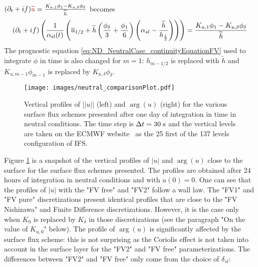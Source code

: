 $ (\partial_t+if) \emphase{\widetilde{u}}
= \frac{K_{u, 1}\phi_1 - K_{u,\delta} \phi_{\delta}}{\widetilde{h}}$
becomes
\begin{equation}
	\label{eq:ND_NeutralCase_semiDiscreteEkmanEqFVfree}
	(\partial_t+if) \left(\frac{1}{\alpha_{\rm sl}(t)}
	\left(\overline{u}_{1/2} + \widetilde{h}
	\left(\frac{\phi_{\delta}}{3} + \frac{\phi_1}{6}\right)
	\left(\alpha_{sl} - \frac{\widetilde{h}}{h_{\frac{1}{2}}}\right)
	\right)\right)
	= \frac{K_{u, 1}\phi_1 - K_{u,\delta} \phi_{\delta}}{\widetilde{h}}
\end{equation}
The prognostic equation \eqref{eq:ND_NeutralCase_continuityEquationFV}
used to integrate $\phi$ in time
is also changed for $m=1$: $h_{m-1/2}$ is replaced
with $\widetilde{h}$ and $K_{u, m-1}\phi_{m-1}$ is replaced by
$K_{u,\delta}\phi_{\delta}$.
%
\begin{figure}[htpb]
	\centering
	\texttt{[image: images/neutral\_comparisonPlot.pdf]}
	\caption[Vertical profiles of $|u|$ and $\arg(u)$]
	{Vertical profiles of $||u||$ (left) and $\arg(u)$ (right)
	for the various surface flux schemes presented
	after one day of integration in time in neutral conditions.
	The time step is $\Delta t = 30 \;{\rm s}$
	and the vertical levels are taken
	on the ECMWF website\footnotemark ~ as the 25 first
	of the 137 levels configuration of IFS.
	}
	\label{fig:ND_NeutralCase_comparisonPlot}
\end{figure}
\par
Figure \ref{fig:ND_NeutralCase_comparisonPlot} is a snapshot of
the vertical profiles of $|u|$ and $\arg(u)$ close to the surface
for the surface flux schemes presented.
The profiles are obtained after 24 hours of integration in neutral
conditions and with $u(0) = 0$.
One can see that the profiles of $|u|$ with the "FV free" and "FV2"
follow a wall law. The "FV1" and "FV pure" discretizations
present identical profiles that are close to the "FV Nishizawa" and
Finite Difference discretizations.
However, it is the case only when $K_0$ is
replaced by $K_{\delta}$ in those discretizations
(see the paragraph "On the value of $K_{u,0}$" below).
The profile of $\arg(u)$ is significantly affected by the surface
flux scheme: this is not surprising as the Coriolis effect is
not taken into account in the surface layer for the "FV2" and
"FV free" parameterizations.
The differences between "FV2" and "FV free" only come from the
choice of $\delta_{sl}$:
